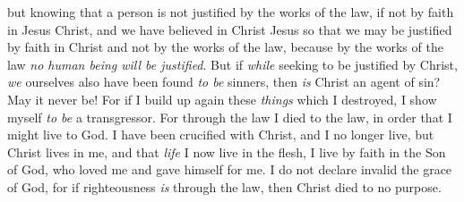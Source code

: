 \begin{biblechapter}
\verse but knowing that a person is not justified by the works of the law, if not by faith in Jesus Christ, and we have believed in Christ Jesus so that we may be justified by faith in Christ and not by the works of the law, because by the works of the law \textit{no human being will be justified}.
\verse But if \textit{while} seeking to be justified by Christ, \textit{we} ourselves also have been found \textit{to be} sinners, then \textit{is} Christ an agent of sin? May it never be!
\verse For if I build up again these \textit{things} which I destroyed, I show myself \textit{to be} a transgressor.
\verse For through the law I died to the law, in order that I might live to God. I have been crucified with Christ,
\verse and I no longer live, but Christ lives in me, and that \textit{life} I now live in the flesh, I live by faith in the Son of God, who loved me and gave himself for me.
\verse I do not declare invalid the grace of God, for if righteousness \textit{is} through the law, then Christ died to no purpose.
\end{biblechapter}

